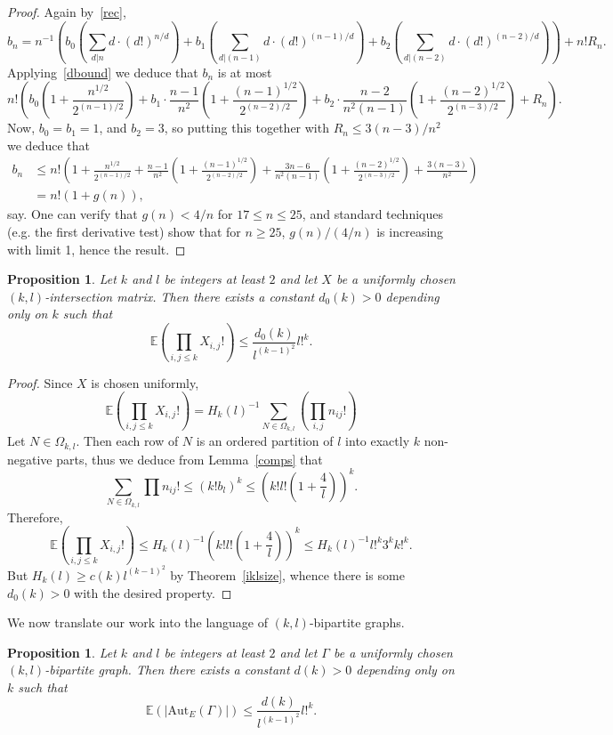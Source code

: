 \documentclass{daj}
\newcommand\Aut{\mathrm{Aut}}
\theoremstyle{plain}
\newtheorem{proposition}[theorem]{Proposition}
\theoremstyle{definition}
\begin{document}
\begin{proof}
Again by~\eqref{rec}, $$b_n=n^{-1}\left(b_0\left(\sum_{d|n}d\cdot (d!)^{n/d}\right)+b_1\left(\sum_{d|(n-1)}d\cdot (d!)^{(n-1)/d}\right)+b_2\left(\sum_{d|(n-2)}d\cdot (d!)^{(n-2)/d}\right)\right)+n!R_n.$$
Applying~\eqref{dbound} we deduce that $b_n$ is at most $$n!\left(b_0\left(1+\frac{n^{1/2}}{2^{(n-1)/2}}\right)+b_1\cdot \frac{n-1}{n^2}\left(1+\frac{(n-1)^{1/2}}{2^{(n-2)/2}}\right)+b_2\cdot \frac{n-2}{n^2(n-1)}\left(1+\frac{(n-2)^{1/2}}{2^{(n-3)/2}}\right)+R_n\right).$$Now, $b_0=b_1=1$, and $b_2=3$, so putting this together with $R_n\leq 3(n-3)/n^2$ we deduce that \begin{align*}b_n&\leq n!\left(1+\frac{n^{1/2}}{2^{(n-1)/2}}+\frac{n-1}{n^2}\left(1+\frac{(n-1)^{1/2}}{2^{(n-2)/2}}\right)+\frac{3n-6}{n^2(n-1)}\left(1+\frac{(n-2)^{1/2}}{2^{(n-3)/2}}\right)+\frac{3(n-3)}{n^2}\right)\\&=n!(1+g(n)),\end{align*} say. 
One can verify that $g(n)<4/n$ for $17\leq n\leq 25$, and standard techniques (e.g. the first derivative test) show that for $n\geq 25$, $g(n)/(4/n)$ is increasing with limit 1, hence the result.
\end{proof}

\begin{proposition}\label{factexp}
Let $k$ and $l$ be integers at least $2$ and let $X$ be a uniformly chosen $(k,l)$-intersection matrix. 
Then there exists a constant $d_0(k)>0$ depending only on $k$ such that $$\mathbb{E}\left(\prod_{i,j\leq k} X_{i,j}!\right)\leq\frac{d_0(k)}{l^{(k-1)^2}}l!^k.$$
\end{proposition}
\begin{proof}
Since $X$ is chosen uniformly, $$\mathbb{E}\left(\prod_{i,j\leq k} X_{i,j}!\right)=H_{k}(l)^{-1}\sum_{N\in\Omega_{k,l}}\left(\prod_{i,j}n_{ij}!\right)
$$ 
Let $N\in\Omega_{k,l}$. Then each row of $N$ is an ordered partition of $l$ into exactly $k$ non-negative parts, thus we deduce from Lemma~\ref{comps} that 
$$\sum_{N\in \Omega_{k,l}}\prod n_{ij}!\leq (k!b_l)^k\leq \left(k!l!\left(1+\frac{4}{l}\right)\right)^k.$$
Therefore, $$\mathbb{E}\left(\prod_{i,j\leq k} X_{i,j}!\right)\leq H_{k}(l)^{-1}\left(k!l!\left(1+\frac{4}{l}\right)\right)^k\leq H_{k}(l)^{-1}l!^k3^kk!^k.$$ But $H_{k}(l)\geq c(k)l^{(k-1)^2}$ by Theorem~\ref{iklsize}, whence there is some $d_0(k)>0$ with the desired property.
\end{proof}

We now translate our work into the language of $(k,l)$-bipartite graphs.
\begin{proposition}\label{bipexp}
Let $k$ and $l$ be integers at least $2$ and let $\Gamma$ be a uniformly chosen $(k,l)$-bipartite graph. Then there exists a constant $d(k)>0$ depending only on $k$ such that $$\mathbb{E}(|\Aut_{E}(\Gamma)|)\leq\frac{d(k)}{l^{(k-1)^2}}l!^k.$$
\end{proposition}
\end{document}
